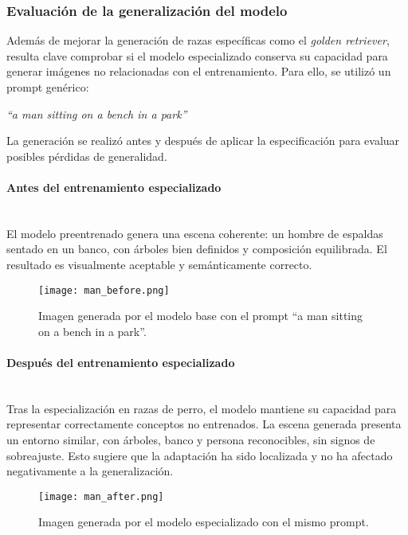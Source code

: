 \subsubsection{Evaluación de la generalización del modelo}

Además de mejorar la generación de razas específicas como el \textit{golden retriever}, resulta clave comprobar si el modelo especializado conserva su capacidad para generar imágenes no relacionadas con el entrenamiento. Para ello, se utilizó un prompt genérico:

\begin{center}
\textit{``a man sitting on a bench in a park''}
\end{center}

La generación se realizó antes y después de aplicar la especificación para evaluar posibles pérdidas de generalidad.

\paragraph{\textbf{Antes del entrenamiento especializado}} \mbox{}\\[0.5em]
El modelo preentrenado genera una escena coherente: un hombre de espaldas sentado en un banco, con árboles bien definidos y composición equilibrada. El resultado es visualmente aceptable y semánticamente correcto.

\begin{figure}[H]
    \centering
    \texttt{[image: man\_before.png]}
    \caption{Imagen generada por el modelo base con el prompt ``a man sitting on a bench in a park''.}
    \label{fig:man-before}
\end{figure}

\paragraph{\textbf{Después del entrenamiento especializado}} \mbox{}\\[0.5em]
Tras la especialización en razas de perro, el modelo mantiene su capacidad para representar correctamente conceptos no entrenados. La escena generada presenta un entorno similar, con árboles, banco y persona reconocibles, sin signos de sobreajuste. Esto sugiere que la adaptación ha sido localizada y no ha afectado negativamente a la generalización.

\begin{figure}[H]
    \centering
    \texttt{[image: man\_after.png]}
    \caption{Imagen generada por el modelo especializado con el mismo prompt.}
    \label{fig:man-after}
\end{figure}

